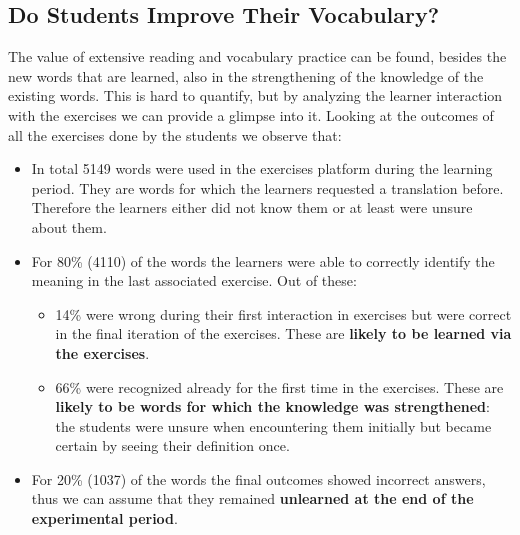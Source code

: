 \begin{added}


\section{Do Students Improve Their Vocabulary?}

  The value of extensive reading and vocabulary practice can be found, besides the new words that are learned, also in the strengthening of the knowledge of the existing words. This is hard to quantify, but by analyzing the learner interaction with the exercises we can provide a glimpse into it. Looking at the outcomes of all the exercises done by the students we observe that:

  \begin{itemize}
    \item In total 5149 words were used in the exercises platform during the learning period. They are words for which the learners requested a translation before. Therefore the learners either did not know them or at least were unsure about them.

    \item For 80\% (4110) of the words the learners were able to correctly identify the meaning in the last associated exercise. Out of these: 

    \begin{itemize}
      \item 14\% were wrong during their first interaction in exercises but were correct in the final iteration of the exercises. These are {\bf likely to be learned via the exercises}.

      \item 66\% were recognized already for the first time in the exercises. These are {\bf likely to be words for which the knowledge was strengthened}: the students were unsure when encountering them initially but became certain by seeing their definition once. 
    \end{itemize}

    \item For 20\% (1037) of the words the final outcomes showed incorrect answers, thus we can assume that they remained {\bf unlearned at the end of the experimental period}.

  \end{itemize}

\end{added}









